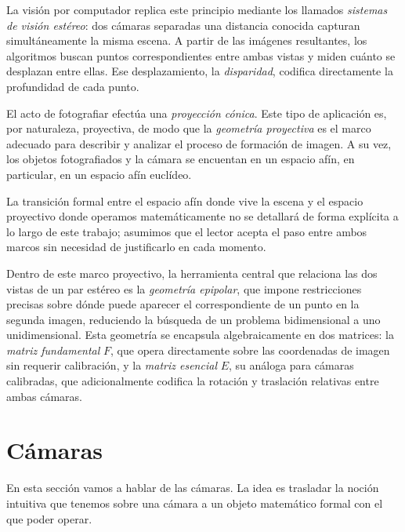 \documentclass[
10pt, %
a4paper, %
oneside, %
headinclude,footinclude, %
BCOR=5mm, %
]{scrartcl}
\begin{document}
La visión por computador replica este principio mediante los llamados
\textit{sistemas de visión estéreo}: dos cámaras separadas una distancia
conocida capturan simultáneamente la misma escena. A partir de las imágenes
resultantes, los algoritmos buscan puntos correspondientes entre ambas vistas
y miden cuánto se desplazan entre ellas. Ese desplazamiento, la
\textit{disparidad}, codifica directamente la profundidad de cada punto.

El acto de fotografiar efectúa una \textit{proyección cónica}. Este tipo de aplicación es, por 
naturaleza, proyectiva, de modo que la \textit{geometría proyectiva} es el marco 
adecuado para describir y analizar el proceso de formación de imagen. A su vez,
los objetos fotografiados y la cámara se encuentan en un espacio afín, en particular, en un
espacio afín euclídeo.

La transición formal entre el espacio afín donde vive la escena y el espacio
proyectivo donde operamos matemáticamente no se detallará de forma explícita a
lo largo de este trabajo; asumimos que el lector acepta el paso entre ambos
marcos sin necesidad de justificarlo en cada momento.

Dentro de este marco proyectivo, la herramienta central que relaciona las dos
vistas de un par estéreo es la \textit{geometría epipolar}, que impone
restricciones precisas sobre dónde puede aparecer el correspondiente de un
punto en la segunda imagen, reduciendo la búsqueda de un problema bidimensional
a uno unidimensional. Esta geometría se encapsula algebraicamente en dos
matrices: la \textit{matriz fundamental} $F$, que opera directamente sobre las
coordenadas de imagen sin requerir calibración, y la \textit{matriz esencial}
$E$, su análoga para cámaras calibradas, que adicionalmente codifica la
rotación y traslación relativas entre ambas cámaras.

\newpage


\section{Cámaras}

En esta sección vamos a hablar de las cámaras. La idea es trasladar la noción intuitiva que tenemos sobre una cámara a un objeto matemático formal con el que poder operar.
\end{document}
